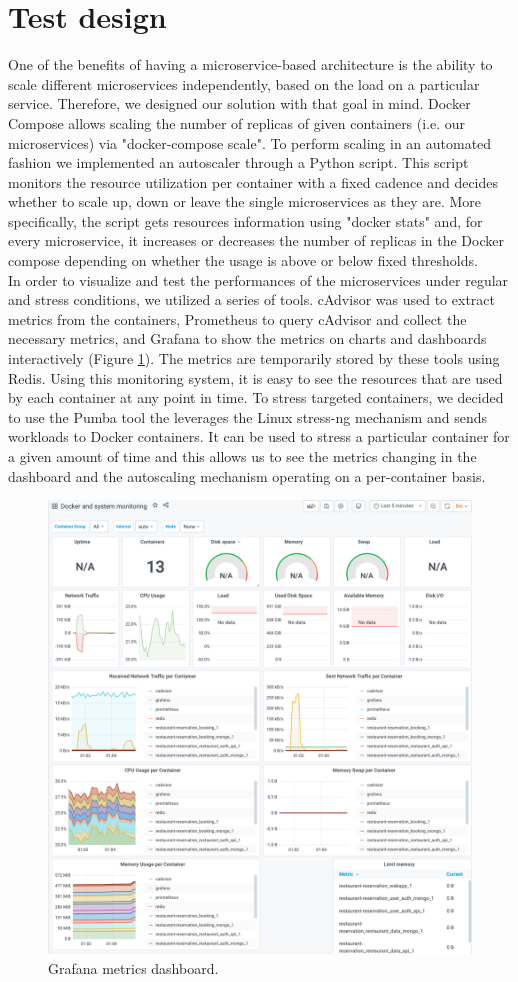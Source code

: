 \section{Test design}

One of the benefits of having a microservice-based architecture is
the ability to scale different microservices independently, based on the
load on a particular service. Therefore, we designed our solution with that
goal in mind. Docker Compose allows scaling the number of replicas of
given containers (i.e. our microservices) via "docker-compose scale". To
perform scaling in an automated fashion we implemented an autoscaler through
a Python script. This script monitors the resource utilization per container
with a fixed cadence and decides whether to scale up, down or leave the single
microservices as they are. More specifically, the script gets resources information
using "docker stats" and, for every microservice, it increases or decreases the
number of replicas in the Docker compose depending on whether the usage is above
or below fixed thresholds.\\
In order to visualize and test the performances of the microservices under regular
and stress conditions, we utilized a series of tools. cAdvisor was used to extract
metrics from the containers, Prometheus to query cAdvisor and collect the necessary
metrics, and Grafana to show the metrics on charts and dashboards interactively
(Figure \ref{fig:grafana}).
The metrics are temporarily stored by these tools using Redis. Using this monitoring
system, it is easy to see the resources that are used by each container at any point in
time. To stress targeted containers, we decided to use the Pumba tool the leverages
the Linux stress-ng mechanism and sends workloads to Docker containers. It can be used
to stress a particular container for a given amount of time and this allows us to see
the metrics changing in the dashboard and the autoscaling mechanism operating on a
per-container basis.


\begin{figure}
    \includegraphics[width=\linewidth]{./images/grafana.png}
    \caption{Grafana metrics dashboard.}
    \label{fig:grafana}
\end{figure}
